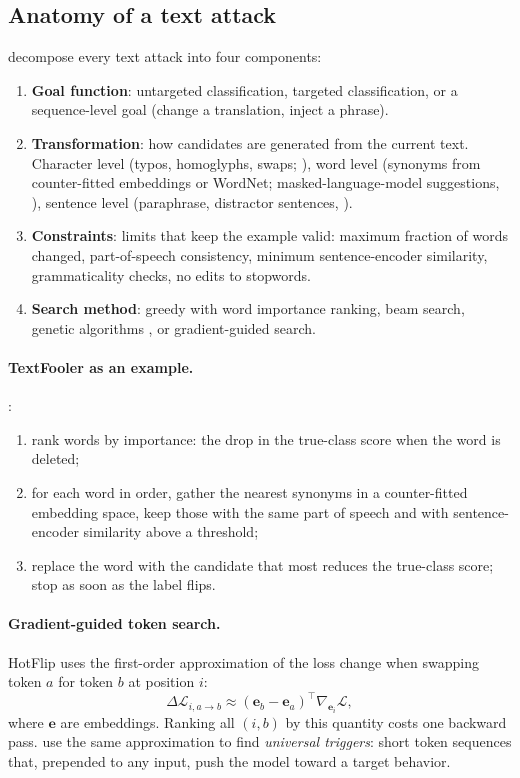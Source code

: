 \documentclass[10pt,a4paper]{extarticle}
\theoremstyle{definition}
\newcommand{\Loss}{\mathcal{L}}
\begin{document}
\subsection{Anatomy of a text attack}

\citet{morris2020textattack} decompose every text attack into four components:
\begin{enumerate}
  \item \textbf{Goal function}: untargeted classification, targeted classification, or a sequence-level goal (change a translation, inject a phrase).
  \item \textbf{Transformation}: how candidates are generated from the current text. Character level (typos, homoglyphs, swaps; \citealp{li2019textbugger}), word level (synonyms from counter-fitted embeddings or WordNet; masked-language-model suggestions, \citealp{li2020bertattack}), sentence level (paraphrase, distractor sentences, \citealp{jia2017adversarial}).
  \item \textbf{Constraints}: limits that keep the example valid: maximum fraction of words changed, part-of-speech consistency, minimum sentence-encoder similarity, grammaticality checks, no edits to stopwords.
  \item \textbf{Search method}: greedy with word importance ranking, beam search, genetic algorithms \citep{alzantot2018generating}, or gradient-guided search.
\end{enumerate}

\paragraph{TextFooler as an example.} \citet{jin2020textfooler}:
\begin{enumerate}
  \item rank words by importance: the drop in the true-class score when the word is deleted;
  \item for each word in order, gather the nearest synonyms in a counter-fitted embedding space, keep those with the same part of speech and with sentence-encoder similarity above a threshold;
  \item replace the word with the candidate that most reduces the true-class score; stop as soon as the label flips.
\end{enumerate}

\paragraph{Gradient-guided token search.} HotFlip \citep{ebrahimi2018hotflip} uses the first-order approximation of the loss change when swapping token \(a\) for token \(b\) at position \(i\):
\[
\Delta\Loss_{i,a\to b}\approx(\mathbf{e}_b-\mathbf{e}_a)^\top\nabla_{\mathbf{e}_i}\Loss,
\]
where \(\mathbf{e}\) are embeddings. Ranking all \((i,b)\) by this quantity costs one backward pass. \citet{wallace2019universal} use the same approximation to find \emph{universal triggers}: short token sequences that, prepended to any input, push the model toward a target behavior.
\end{document}
